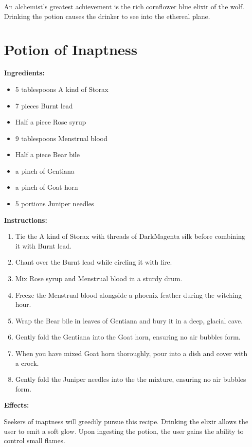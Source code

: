 \documentclass{article}
\begin{document}
An alchemist's greatest achievement is the rich cornflower blue elixir of the wolf. Drinking the potion causes the drinker to see into the ethereal plane.

\newpage
\section*{Potion of Inaptness}

\textbf{Ingredients:}

\begin{itemize}
  \item 5 tablespoons A kind of Storax
  \item 7 pieces Burnt lead
  \item Half a piece Rose syrup
  \item 9 tablespoons Menstrual blood
  \item Half a piece Bear bile
  \item a pinch of Gentiana
  \item a pinch of Goat horn
  \item 5 portions Juniper needles
\end{itemize}

\textbf{Instructions:}

\begin{enumerate}
  \item Tie the A kind of Storax with threads of DarkMagenta silk before combining it with Burnt lead.
  \item Chant over the Burnt lead while circling it with fire.
  \item Mix Rose syrup and Menstrual blood in a sturdy drum.
  \item Freeze the Menstrual blood alongside a phoenix feather during the witching hour.
  \item Wrap the Bear bile in leaves of Gentiana and bury it in a deep, glacial cave.
  \item Gently fold the Gentiana into the Goat horn, ensuring no air bubbles form.
  \item When you have mixed Goat horn thoroughly, pour into a dish and cover with a crock.
  \item Gently fold the Juniper needles into the the mixture, ensuring no air bubbles form.
\end{enumerate}

\textbf{Effects:}

Seekers of inaptness will greedily pursue this recipe. Drinking the elixir allows the user to emit a soft glow. Upon ingesting the potion, the user gains the ability to control small flames.
\end{document}

